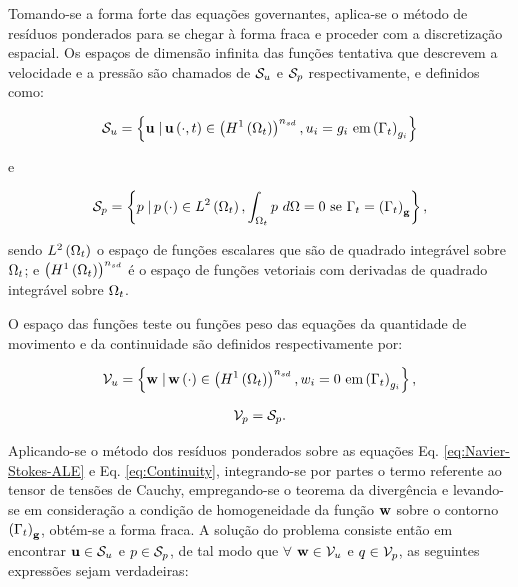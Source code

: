 \documentclass[tese_patricia]{subfiles}%
\begin{document}
Tomando-se a forma forte das equações governantes, aplica-se o método de resíduos ponderados para se chegar à forma fraca e proceder com a discretização espacial. Os espaços de dimensão infinita das funções tentativa que descrevem a velocidade e a pressão são chamados de $\mathcal{S}_u$ e $\mathcal{S}_p$ respectivamente, e definidos como:

\begin{align}
\mathcal{S}_u = \left\{\mathbf{u} \left . \right| \mathbf{u} \left(\cdot,t\right) \in \left(H^{1}\left(\Omega_t\right)\right)^{n_{sd}}, u_{i} = g_{i} \textrm { em} \left(\Gamma_{t}\right)_{g_i} \right\}
\end{align}

\noindent e

\begin{align}
\mathcal{S}_p = \left\{p \left . \right| p \left(\cdot\right) \in L^{2}\left(\Omega_t\right), \int_{\Omega_t}p \textrm { } d\Omega = 0 \textrm { se } \Gamma_{t} =\left(\Gamma_{t}\right)_{\mathbf{g}} \right\},
\end{align}

\noindent sendo $L^{2}\left(\Omega_t\right)$ o espaço de funções escalares que são de quadrado integrável sobre $\Omega_t$; e $\left(H^{1}\left(\Omega_t\right)\right)^{n_{sd}}$ é o espaço de funções vetoriais com derivadas de quadrado integrável sobre $\Omega_t$.

O espaço das funções teste ou funções peso das equações da quantidade de movimento e da continuidade são definidos respectivamente por:

\begin{align}
\mathcal{V}_u = \left\{\mathbf{w} \left . \right| \mathbf{w} \left(\cdot\right) \in \left(H^{1}\left(\Omega_t\right)\right)^{n_{sd}}, w_{i} = 0 \textrm { em} \left(\Gamma_{t}\right)_{g_i} \right\},
\end{align}

\begin{align}
\mathcal{V}_p = \mathcal{S}_p.
\end{align}

Aplicando-se o método dos resíduos ponderados sobre as equações Eq. \eqref{eq:Navier-Stokes-ALE} e Eq. \eqref{eq:Continuity}, integrando-se por partes o termo referente ao tensor de tensões de Cauchy, empregando-se o teorema da divergência e levando-se em consideração a condição de homogeneidade da função $\mathbf{w}$ sobre o contorno $\left(\Gamma_{t}\right)_{\mathbf{g}}$, obtém-se a forma fraca. A solução do problema consiste então em encontrar $\mathbf{u} \in \mathcal{S}_u$ e $p \in \mathcal{S}_p$, de tal modo que $\forall$ $\mathbf{w} \in \mathcal{V}_u$ e $q \in \mathcal{V}_p$, as seguintes expressões sejam verdadeiras:
\end{document}
